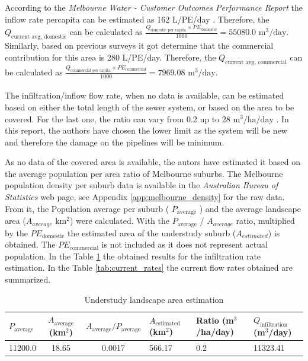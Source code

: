 \documentclass[11pt]{article}
\begin{document}
According to the \textit{Melbourne Water - Customer Outcomes Performance Report} the inflow rate percapita
can be estimated as 
162
L/PE/day \cite{melbournewater_2024_customer_outcomes}. Therefore, the 
\( Q_{\text{current avg, domestic}} \) can be calculated as 
\(\frac{Q_{\text{domestic per capita}} \times PE_{\text{domestic}}}{1000}= 55080.0\)
\(\mathrm{m^3/day}\).
Similarly, based on previous surveys it got determine that the commercial contribution for this area is
280 L/PE/day. Therefore, the 
\( Q_{\text{current avg, commercial}} \) can be calculated as
\(\frac{Q_{\text{commercial per capita}} \times PE_{\text{commercial}}}{1000}= 7969.08\)
\(\mathrm{m^3/day}\).\\
\\
The infiltration/inflow flow rate, when no data is available, can be estimated based on either the
total length of the sewer system, or based on the area to be covered. For the last one, the ratio can vary
from 0.2 up to 28 \(\mathrm{m^3/ha/day}\) \cite{metcalf_2014_wastewater}. In this report, the authors
have chosen the lower limit as the system will be new and therefore the damage on the pipelines will be
minimum. 

As no data of the covered area is available, the autors have estimated it based on the average
population per area ratio of Melbourne suburbs. The Melbourne population density per suburb data is available in the 
\textit{Australian Bureau of Statistics} web page, see Appendix  \ref{app:melbourne_density} for the raw data.
From it, the Population average per suburb ( \(P_{\text{average}}\) ) and the average landscape area (\(A_{average}\) \(\mathrm{km^2}\))
were calculated. With the \(P_{\text{average}}\) / \(A_{average}\) ratio, multiplied by the \(PE_{\mathrm{domestic}}\)
the estimated area of the understudy suburb (\(A_{estimated}\)) is obtained. The \(PE_{\mathrm{commercial}}\) is not included
as it does not represent actual population. In the Table \ref{tab:und_study_area} the obtained results for the infiltration 
rate estimation. In the Table \ref{tab:current_rates} the current flow rates obtained are summarized.\\

\begin{table}[h]
  \centering
  \caption{Understudy landscape area estimation}
  \label{tab:und_study_area}
  \begin{tabularx}{\textwidth}{|X|c|c|X|X|X|}
  \hline
  $P_{\text{average}}$ & $A_{\text{average}}$ (km$^2$) & $A_{\text{average}} / P_{\text{average}}$ & $A_{\text{estimated}}$ (km$^2$) & Ratio (m$^3$/ha/day) & $Q_{\text{infiltration}}$ (m$^3$/day) \\
  \hline
  11200.0 & 18.65 & 0.0017 & 566.17 & 0.2 & 11323.41 \\
  \hline
  \end{tabularx}
\end{table}
\end{document}
